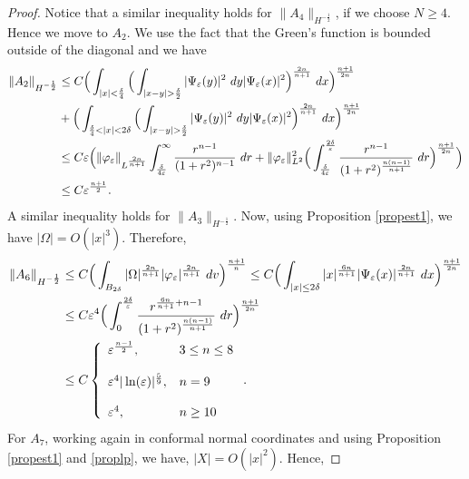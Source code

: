\documentclass[10pt,a4paper]{amsart}
\begin{document}
\begin{proof}
\noindent
Notice that a similar inequality holds for $\|A_{4}\|_{H^{-\frac{1}{2}}}$, if we choose $N\geq 4$. Hence we move to $A_{2}$. We use the fact that the Green's function is bounded outside of the diagonal and we have
\begin{align}
\|A_{2}\|_{H^{-\frac{1}{2}}}&\leq C \Big(\int_{|x|<\frac{\delta}{4}}\Big(\int_{|x-y|>\frac{\delta}{2}}|\Psi_{\varepsilon}(y)|^{2}\ dy |\Psi_{\varepsilon}(x)|^{2}\Big)^{\frac{2n}{n+1}}\ dx \Big)^{\frac{n+1}{2n}}\notag\\
&+\Big(\int_{\frac{\delta}{4}<|x|<2\delta}\Big(\int_{|x-y|>\frac{\delta}{2}}|\Psi_{\varepsilon}(y)|^{2}\ dy |\Psi_{\varepsilon}(x)|^{2}\Big)^{\frac{2n}{n+1}}\ dx \Big)^{\frac{n+1}{2n}}\notag\\
&\leq C \varepsilon\Big( \|\varphi_{\varepsilon}\|_{L^{\frac{2n}{n+1}}}\int_{\frac{\delta}{4\varepsilon}}^{\infty}\frac{r^{n-1}}{(1+r^{2})^{n-1}}\ dr +\|\varphi_{\varepsilon}\|_{L^{2}}^{2}\Big(\int_{\frac{\delta}{4\varepsilon}}^{\frac{2\delta}{\varepsilon}} \frac{r^{n-1}}{(1+r^{2})^{\frac{n(n-1)}{n+1}}}\ dr \Big)^{\frac{n+1}{2n}}\Big)\notag\\
& \leq C \varepsilon^{\frac{n+1}{2}}.\notag
\end{align}
A similar inequality holds for $\|A_{3}\|_{H^{-\frac{1}{2}}}$. Now, using Proposition \ref{propest1}, we have $|\Omega|=O(|x|^{3})$. Therefore,
\begin{align}
\|A_{6}\|_{H^{-\frac{1}{2}}}&\leq C \Big(\int_{B_{2\delta}}|\Omega|^{\frac{2n}{n+1}}|\varphi_{\varepsilon}|^{\frac{2n}{n+1}}\ dv \Big)^{\frac{n+1}{n}} \leq C \Big( \int_{|x|\leq 2\delta} |x|^{\frac{6n}{n+1}}|\Psi_{\varepsilon}(x)|^{\frac{2n}{n+1}}\ dx\Big)^{\frac{n+1}{2n}} \notag\\
&\leq C \varepsilon^{4} \Big( \int_{0}^{\frac{2\delta}{\varepsilon}} \frac{r^{\frac{6n}{n+1}+n-1}}{(1+r^{2})^{\frac{n(n-1)}{n+1}}}\ dr \Big)^{\frac{n+1}{2n}}\notag\\
&\leq C \left\{\begin{array}{ll}
\varepsilon^{\frac{n-1}{2}}, & 3\leq n\leq 8\\
\\
\varepsilon^{4}|\ln(\varepsilon)|^{\frac{5}{9}}, & n=9\\
\\
\varepsilon^{4}, & n\geq 10
\end{array}
\right..\notag
\end{align}
For $A_{7}$, working again in conformal normal coordinates and using Proposition \ref{propest1} and \ref{proplp}, we have, $|X|=O(|x|^{2})$. Hence,

\end{proof}
\end{document}
